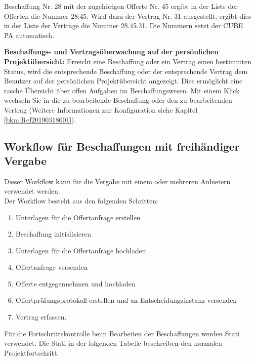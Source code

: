 \vspace{\baselineskip}

Beschaffung Nr. 28 mit der zugehörigen Offerte Nr. 45 ergibt in der Liste der Offerten die Nummer 28.45. Wird dazu der Vertrag Nr. 31 ausgestellt, ergibt dies in der Liste der Verträge die Nummer 28.45.31. Die Nummern setzt der CUBE PA automatisch.

\vspace{\baselineskip}
\textbf{Beschaffungs- und Vertragsüberwachung auf der persönlichen Projektübersicht:}
Erreicht eine Beschaffung oder ein Vertrag einen bestimmten Status, wird die entsprechende Beschaffung oder der entsprechende Vertrag dem Benutzer auf der persönlichen Projektübersicht angezeigt. Dies ermöglicht eine rasche Übersicht über offen Aufgaben im Beschaffungswesen. Mit einem Klick wechseln Sie in die zu bearbeitende Beschaffung oder den zu bearbeitenden Vertrag (Weitere Informationen zur Konfiguration siehe Kapitel \ref{bkm:Ref20190318001}).

\subsection{Workflow für Beschaffungen mit freihändiger Vergabe}

Dieser Workflow kann für die Vergabe mit einem oder mehreren Anbietern verwendet werden. \\
Der Workflow besteht aus den folgenden Schritten:

\begin{enumerate}
\item Unterlagen für die Offertanfrage erstellen
\item Beschaffung initialisieren
\item Unterlagen für die Offertanfrage hochladen
\item Offertanfrage versenden
\item Offerte entgegennehmen und hochladen
\item Offertprüfungsprotokoll erstellen und an Entscheidungsinstanz versenden
\item Vertrag erfassen.
\end{enumerate}

Für die Fortschrittskontrolle beim Bearbeiten der Beschaffungen werden Stati verwendet. Die Stati in der folgenden Tabelle beschreiben den normalen Projektfortschritt.

\vspace{\baselineskip}

